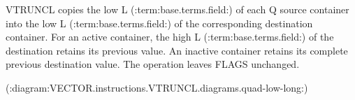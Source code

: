 VTRUNCL copies the low L (:term:base.terms.field:) of each Q source container into the low L (:term:base.terms.field:) of
the corresponding destination container.  For an active container, the high L
(:term:base.terms.field:) of the destination retains its previous value.  An inactive container
retains its complete previous destination value.  The operation leaves FLAGS
unchanged.

(:diagram:VECTOR.instructions.VTRUNCL.diagrams.quad-low-long:)
